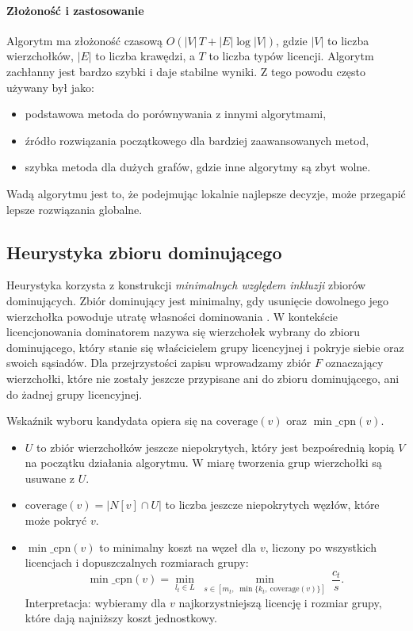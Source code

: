 \paragraph{Złożoność i zastosowanie}
Algorytm ma złożoność czasową $O(|V|\,T + |E|\log |V|)$, gdzie $|V|$ to liczba wierzchołków, $|E|$ to liczba krawędzi, a $T$ to liczba typów licencji.
Algorytm zachłanny jest bardzo szybki i daje stabilne wyniki. Z tego powodu często używany był jako:
\begin{itemize}
  \item podstawowa metoda do porównywania z innymi algorytmami,
  \item źródło rozwiązania początkowego dla bardziej zaawansowanych metod,
  \item szybka metoda dla dużych grafów, gdzie inne algorytmy są zbyt wolne.
\end{itemize}
Wadą algorytmu jest to, że podejmując lokalnie najlepsze decyzje, może przegapić lepsze rozwiązania globalne.
\subsection{Heurystyka zbioru dominującego}\label{subsec:ds}

Heurystyka korzysta z konstrukcji \emph{minimalnych względem inkluzji} zbiorów dominujących. Zbiór dominujący jest minimalny, gdy usunięcie dowolnego jego wierzchołka powoduje utratę własności dominowania \cite{haynes1998domination}. W kontekście licencjonowania dominatorem nazywa się wierzchołek wybrany do zbioru dominującego, który stanie się właścicielem grupy licencyjnej i pokryje siebie oraz swoich sąsiadów. Dla przejrzystości zapisu wprowadzamy zbiór $F$ oznaczający wierzchołki, które nie zostały jeszcze przypisane ani do zbioru dominującego, ani do żadnej grupy licencyjnej.

Wskaźnik wyboru kandydata opiera się na \(\mathrm{coverage}(v)\) oraz \(\min\_\mathrm{cpn}(v)\).
\begin{itemize}
  \item $U$ to zbiór wierzchołków jeszcze niepokrytych, który jest bezpośrednią kopią $V$ na początku działania algorytmu. W miarę tworzenia grup wierzchołki są usuwane z $U$.
  \item \(\mathrm{coverage}(v)=|N[v]\cap U|\) to liczba jeszcze niepokrytych węzłów, które może pokryć \(v\).
  \item \(\min\_\mathrm{cpn}(v)\) to minimalny koszt na węzeł dla \(v\), liczony po wszystkich licencjach i dopuszczalnych rozmiarach grupy:
        \[
          \min\_\mathrm{cpn}(v)=\min_{l_t\in L}\;\min_{s\in[m_t,\;\min\{k_t,\ \mathrm{coverage}(v)\}]}\ \frac{c_t}{s}.
        \]
        Interpretacja: wybieramy dla \(v\) najkorzystniejszą licencję i rozmiar grupy, które dają najniższy koszt jednostkowy.
\end{itemize}

